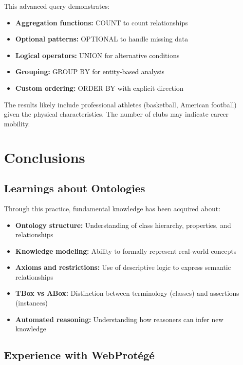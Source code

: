 \documentclass[12pt,a4paper]{article}
\begin{document}
This advanced query demonstrates:

\begin{itemize}
    \item \textbf{Aggregation functions:} COUNT to count relationships
    \item \textbf{Optional patterns:} OPTIONAL to handle missing data
    \item \textbf{Logical operators:} UNION for alternative conditions
    \item \textbf{Grouping:} GROUP BY for entity-based analysis
    \item \textbf{Custom ordering:} ORDER BY with explicit direction
\end{itemize}

The results likely include professional athletes (basketball, American football) given the physical characteristics. The number of clubs may indicate career mobility.

\section{Conclusions}

\subsection{Learnings about Ontologies}

Through this practice, fundamental knowledge has been acquired about:

\begin{itemize}
    \item \textbf{Ontology structure:} Understanding of class hierarchy, properties, and relationships
    \item \textbf{Knowledge modeling:} Ability to formally represent real-world concepts
    \item \textbf{Axioms and restrictions:} Use of descriptive logic to express semantic relationships
    \item \textbf{TBox vs ABox:} Distinction between terminology (classes) and assertions (instances)
    \item \textbf{Automated reasoning:} Understanding how reasoners can infer new knowledge
\end{itemize}

\subsection{Experience with WebProtégé}
\end{document}
